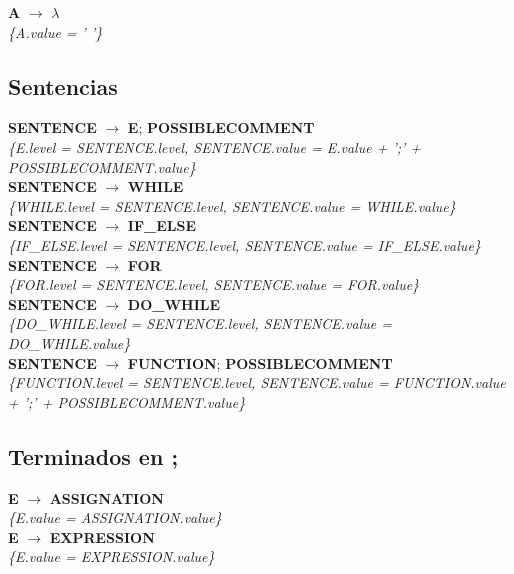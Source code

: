 \documentclass[10pt,a4paper]{article}
\begin{document}
\textbf{A} $\rightarrow$ $\lambda$ \\
\textit{\{A.value = ' '\}} \\

\subsection{Sentencias}
\textbf{SENTENCE} $\rightarrow$ \textbf{E}; \textbf{POSSIBLECOMMENT}\\ 
\textit{\{E.level = SENTENCE.level, SENTENCE.value = E.value + ';' + POSSIBLECOMMENT.value\}} \\

\textbf{SENTENCE} $\rightarrow$ \textbf{WHILE} \\ 
\textit{\{WHILE.level = SENTENCE.level, SENTENCE.value = WHILE.value\}} \\

\textbf{SENTENCE} $\rightarrow$ \textbf{IF\_ELSE}  \\ 
\textit{\{IF\_ELSE.level = SENTENCE.level, SENTENCE.value = IF\_ELSE.value\}} \\

\textbf{SENTENCE} $\rightarrow$ \textbf{FOR} \\ 
\textit{\{FOR.level = SENTENCE.level, SENTENCE.value = FOR.value\}} \\

\textbf{SENTENCE} $\rightarrow$ \textbf{DO\_WHILE} \\ 
\textit{\{DO\_WHILE.level = SENTENCE.level, SENTENCE.value = DO\_WHILE.value\}}  \\

\textbf{SENTENCE} $\rightarrow$ \textbf{FUNCTION}; \textbf{POSSIBLECOMMENT} \\
\textit{\{FUNCTION.level = SENTENCE.level, SENTENCE.value = FUNCTION.value + ';' + POSSIBLECOMMENT.value\}} \\

\subsection{Terminados en ;}

\textbf{E} $\rightarrow$ \textbf{ASSIGNATION}\\
\textit{\{E.value = ASSIGNATION.value\}}\\

\textbf{E} $\rightarrow$ \textbf{EXPRESSION} \\
\textit{\{E.value = EXPRESSION.value\}} \\
\end{document}
